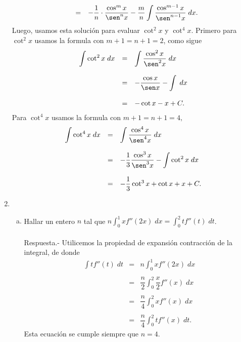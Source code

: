 \begin{enumerate}[\bfseries 1.]
$$\begin{array}{rcl}
	    &=& -\dfrac{1}{n}\cdot \dfrac{\cos^m x}{\sen^n x}-\dfrac{m}{n}\displaystyle\int \dfrac{\cos^{m-1}x}{\sen^{n-1}x}\; dx.
	\end{array}
	$$
	Luego, usamos esta solución para evaluar $\cot^2 x$ y $\cot^4 x$. Primero para $\cot^2 x$ usamos la formula con $m+1=n+1=2$, como sigue
	$$
	\begin{array}{rcl}
	    \displaystyle\int \cot^2 x\; dx &=& \displaystyle\int \dfrac{\cos^2 x}{\sen^2 x}\; dx\\\\
	    &=& -\dfrac{\cos x}{\sen x} - \displaystyle\int \; dx\\\\
	    &=& - \cot x - x + C.
	\end{array}
	$$
	Para $\cot^4 x$ usamos la formula con $m+1=n+1=4,$
	$$
	\begin{array}{rcl}
	    \displaystyle\int \cot^4 x\; dx &=& \displaystyle \int \dfrac{\cos^4 x}{\sen^4 x}\; dx\\\\
	    &=& -\dfrac{1}{3}\dfrac{\cos^3 x}{\sen^3 x} - \displaystyle \int \cot^2 x\; dx\\\\
	    &=& -\dfrac{1}{3}\cot^3 x + \cot x + x + C.
	\end{array}
	$$
	\vspace{.5cm}
	

    \item 
	\begin{enumerate}[(a)]

	    \item Hallar un entero $n$ tal que $n\int_0^1 x f''(2x)\; dx = \int_0^2 tf''(t)\; dt$.\\\\
		Respuesta.-\; Utilicemos la propiedad de expansión contracción de la integral, de donde
		$$
		\begin{array}{rcl}
		    \displaystyle\int t f''(t)\; dt &=& n\displaystyle\int_0^1 xf''(2x)\; dx\\\\
		    &=& \dfrac{n}{2} \displaystyle\int_0^2 \dfrac{x}{2} f''(x)\; dx\\\\
		    &=& \dfrac{n}{4}\displaystyle\int_0^2 xf''(x)\; dx\\\\
		    &=& \dfrac{n}{4}\displaystyle\int_0^2 t f''(x)\; dt.
		\end{array}
		$$
		Esta ecuación se cumple siempre que $n=4$.\\\\


\end{enumerate}
\end{enumerate}
